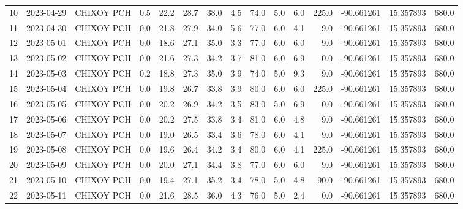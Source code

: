 \documentclass[12pt]{article}
\begin{document}
\begin{center}
\begin{tabular}{lllrrrrrrrrrrrr}
10  & 2023-04-29 &  CHIXOY PCH &     0.5 &  22.2 &   28.7 &  38.0 &        4.5 &     74.0 &  5.0 &         6.0 &       225.0 & -90.661261 &  15.357893 &    680.0 \\
11  & 2023-04-30 &  CHIXOY PCH &     0.0 &  21.8 &   27.9 &  34.0 &        5.6 &     77.0 &  6.0 &         4.1 &         9.0 & -90.661261 &  15.357893 &    680.0 \\
12  & 2023-05-01 &  CHIXOY PCH &     0.0 &  18.6 &   27.1 &  35.0 &        3.3 &     77.0 &  6.0 &         6.0 &         9.0 & -90.661261 &  15.357893 &    680.0 \\
13  & 2023-05-02 &  CHIXOY PCH &     0.0 &  21.6 &   27.3 &  34.2 &        3.7 &     81.0 &  6.0 &         6.9 &         0.0 & -90.661261 &  15.357893 &    680.0 \\
14  & 2023-05-03 &  CHIXOY PCH &     0.2 &  18.8 &   27.3 &  35.0 &        3.9 &     74.0 &  5.0 &         9.3 &         9.0 & -90.661261 &  15.357893 &    680.0 \\
15  & 2023-05-04 &  CHIXOY PCH &     0.0 &  19.8 &   26.7 &  33.8 &        3.9 &     80.0 &  6.0 &         6.0 &       225.0 & -90.661261 &  15.357893 &    680.0 \\
16  & 2023-05-05 &  CHIXOY PCH &     0.0 &  20.2 &   26.9 &  34.2 &        3.5 &     83.0 &  5.0 &         6.9 &         0.0 & -90.661261 &  15.357893 &    680.0 \\
17  & 2023-05-06 &  CHIXOY PCH &     0.0 &  20.2 &   27.5 &  33.8 &        3.4 &     81.0 &  6.0 &         4.8 &         9.0 & -90.661261 &  15.357893 &    680.0 \\
18  & 2023-05-07 &  CHIXOY PCH &     0.0 &  19.0 &   26.5 &  33.4 &        3.6 &     78.0 &  6.0 &         4.1 &         9.0 & -90.661261 &  15.357893 &    680.0 \\
19  & 2023-05-08 &  CHIXOY PCH &     0.0 &  19.6 &   26.4 &  34.2 &        3.4 &     80.0 &  6.0 &         4.1 &       225.0 & -90.661261 &  15.357893 &    680.0 \\
20  & 2023-05-09 &  CHIXOY PCH &     0.0 &  20.0 &   27.1 &  34.4 &        3.8 &     77.0 &  6.0 &         6.0 &         9.0 & -90.661261 &  15.357893 &    680.0 \\
21  & 2023-05-10 &  CHIXOY PCH &     0.0 &  19.4 &   27.1 &  35.2 &        3.4 &     78.0 &  5.0 &         4.8 &        90.0 & -90.661261 &  15.357893 &    680.0 \\
22  & 2023-05-11 &  CHIXOY PCH &     0.0 &  21.6 &   28.5 &  36.0 &        4.3 &     76.0 &  5.0 &         2.4 &         0.0 & -90.661261 &  15.357893 &    680.0 \\

\end{tabular}
\end{center}
\end{document}
